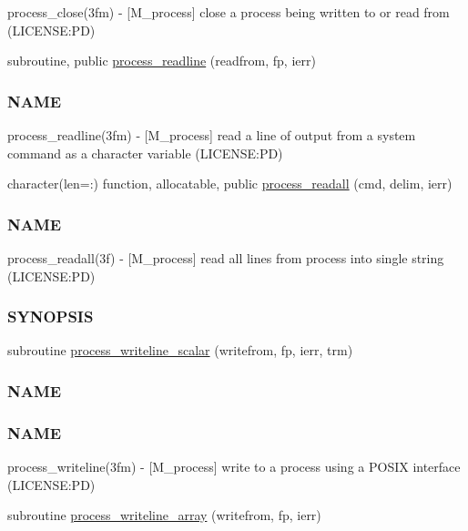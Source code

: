 \begin{DoxyCompactItemize}
\begin{DoxyCompactList}
process\+\_\+close(3fm) -\/ \mbox{[}M\+\_\+process\mbox{]} close a process being written to or read from (L\+I\+C\+E\+N\+SE\+:PD) \end{DoxyCompactList}\item 
subroutine, public \mbox{\hyperlink{namespacem__process_acbc72c5ed371430a471aa1f3010fbbda}{process\+\_\+readline}} (readfrom, fp, ierr)
\begin{DoxyCompactList}\small\item\em \subsubsection*{N\+A\+ME}

process\+\_\+readline(3fm) -\/ \mbox{[}M\+\_\+process\mbox{]} read a line of output from a system command as a character variable (L\+I\+C\+E\+N\+SE\+:PD) \end{DoxyCompactList}\item 
character(len=\+:) function, allocatable, public \mbox{\hyperlink{namespacem__process_a7dd759a1344789477ae1e205d7fa9a51}{process\+\_\+readall}} (cmd, delim, ierr)
\begin{DoxyCompactList}\small\item\em \subsubsection*{N\+A\+ME}

process\+\_\+readall(3f) -\/ \mbox{[}M\+\_\+process\mbox{]} read all lines from process into single string (L\+I\+C\+E\+N\+SE\+:PD) \subsubsection*{S\+Y\+N\+O\+P\+S\+IS}\end{DoxyCompactList}\item 
subroutine \mbox{\hyperlink{namespacem__process_a72527c0ec0af26dcb14b8bfad6dcd482}{process\+\_\+writeline\+\_\+scalar}} (writefrom, fp, ierr, trm)
\begin{DoxyCompactList}\small\item\em \subsubsection*{N\+A\+ME}

\subsubsection*{N\+A\+ME}

process\+\_\+writeline(3fm) -\/ \mbox{[}M\+\_\+process\mbox{]} write to a process using a P\+O\+S\+IX interface (L\+I\+C\+E\+N\+SE\+:PD) \end{DoxyCompactList}\item 
subroutine \mbox{\hyperlink{namespacem__process_a08887a918eba167ceacddf58ca084270}{process\+\_\+writeline\+\_\+array}} (writefrom, fp, ierr)
\end{DoxyCompactItemize}
